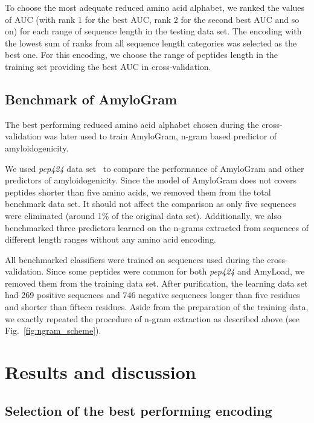 \documentclass{bioinfo}
\begin{document}
\begin{methods}
  To choose the most adequate reduced amino acid alphabet, we ranked the values 
of AUC (with rank 1 for the best AUC, rank 2 for the second best AUC and so on) 
for each range of sequence length in the testing data set. The encoding with 
the lowest sum of ranks from all sequence length categories was selected as 
the best one. For this encoding, we choose the range of peptides length in the 
training set providing the best AUC in cross-validation.


\subsection{Benchmark of AmyloGram}

The best performing reduced amino acid alphabet chosen during the 
cross-validation was later used to train AmyloGram, n-gram based predictor of 
amyloidogenicity.

  We used \textit{pep424} data set~\cite{walsh_pasta_2014} to compare the 
performance of AmyloGram and other predictors of amyloidogenicity. Since the 
model of AmyloGram does not covers peptides shorter than five amino acids, we 
removed them from the total benchmark data set. It should not affect the 
comparison as only five sequences were eliminated (around 1\% of the original 
data set). Additionally, we also benchmarked three predictors learned on the 
n-grams extracted from sequences of different length ranges without any amino 
acid encoding.

  All benchmarked classifiers were trained on sequences used during the 
cross-validation. Since some peptides were common for both \textit{pep424} and 
AmyLoad, we removed them from the training data set. After purification, the 
learning data set had 269 positive sequences and 746 negative sequences longer 
than five residues and shorter than fifteen residues. Aside from the 
preparation of the training data, we exactly repeated the procedure of n-gram 
extraction as described above (see Fig.~\ref{fig:ngram_scheme}). 


\end{methods}

\section{Results and discussion}

\subsection{Selection of the best performing encoding}
\end{document}
